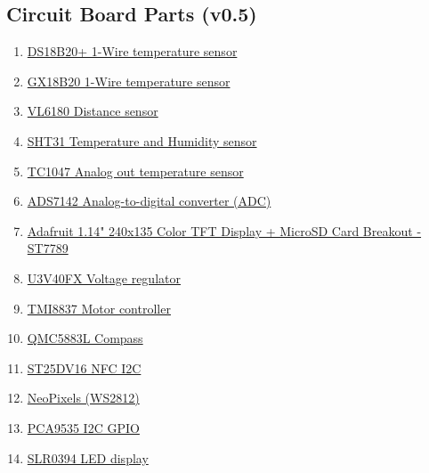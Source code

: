 \subsection{Circuit Board Parts (v0.5)}
\begin{enumerate}
    \item \href{https://datasheets.maximintegrated.com/en/ds/DS18B20.pdf}{DS18B20+ 1-Wire temperature sensor}
    \item \href{https://datasheet.lcsc.com/lcsc/2001041707_GXCAS-GX18B20_C472471.pdf}{GX18B20 1-Wire temperature sensor}
    \item \href{https://www.st.com/resource/en/datasheet/vl6180.pdf}{VL6180 Distance sensor}
    \item \href{https://sensirion.com/media/documents/213E6A3B/61641DC3/Sensirion_Humidity_Sensors_SHT3x_Datasheet_digital.pdf}{SHT31 Temperature and Humidity sensor}
    \item \href{https://ww1.microchip.com/downloads/en/DeviceDoc/21498D.pdf}{TC1047 Analog out temperature sensor}
    \item \href{https://www.ti.com/lit/ds/symlink/ads7142.pdf?ts=1660651868135}{ADS7142 Analog-to-digital converter (ADC)}
    \item \href{https://www.adafruit.com/product/4383}{Adafruit 1.14" 240x135 Color TFT Display + MicroSD Card Breakout - ST7789}
    \item \href{https://www.pololu.com/product/4012}{U3V40FX Voltage regulator}
    \item \href{https://datasheet.lcsc.com/lcsc/2001060933_TMI-TMI8837_C478955.pdf}{TMI8837 Motor controller}
    \item \href{https://datasheet.lcsc.com/lcsc/2012221837_QST-QMC5883L_C976032.pdf}{QMC5883L Compass}
    \item \href{https://www.st.com/resource/en/datasheet/st25dv16k.pdf}{ST25DV16 NFC I2C}
    \item \href{https://datasheet.lcsc.com/lcsc/2106062036_Worldsemi-WS2812B-B-W_C2761795.pdf}{NeoPixels (WS2812)}
    \item \href{https://www.nxp.com/docs/en/data-sheet/PCA9535_PCA9535C.pdf}{PCA9535 I2C GPIO}
    \item \href{https://datasheet.lcsc.com/lcsc/1810191633_SUNLIGHT-SLR0394FG3C5BD-3-5_C225905.pdf}{SLR0394 LED display}
\end{enumerate}

